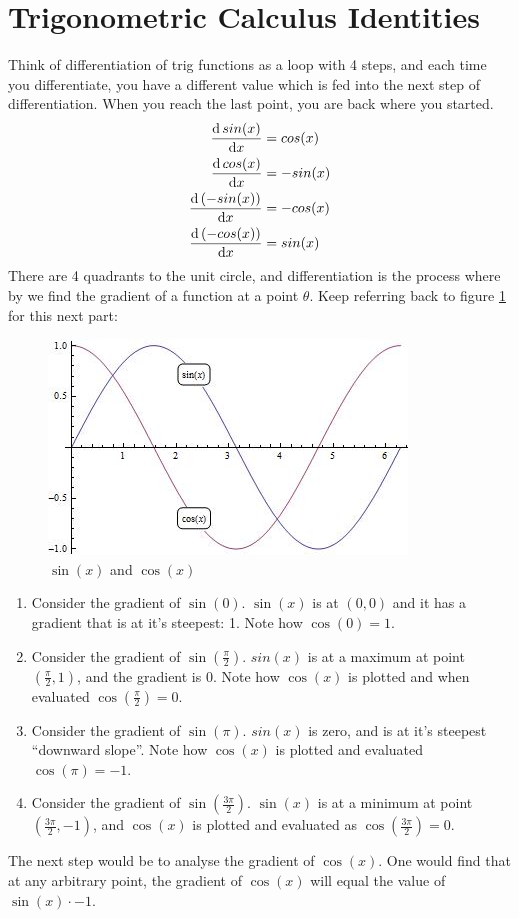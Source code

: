 \section{Trigonometric Calculus Identities}
\label{sec:TrigCalculus}
Think of differentiation of trig functions as a loop with 4 steps, and each time
you differentiate, you have a different value which is fed into the next step of
differentiation. When you reach the last point, you are back where you
started.
\begin{align}
  \frac{\mathrm{d}\,sin(x)}{\mathrm{d}x}  & = cos(x) \\
  \frac{\mathrm{d}\,cos(x)}{\mathrm{d}x}  & = -sin(x) \\
  \frac{\mathrm{d}\,(-sin(x))}{\mathrm{d}x} & = -cos(x) \\
  \frac{\mathrm{d}\,(-cos(x))}{\mathrm{d}x} & = sin(x)
\end{align}
There are 4 quadrants to the unit circle, and differentiation is the process
where by we find the gradient of a function at a point $\theta$. Keep referring
back to figure \ref{fig:TrigCalcSinxCosx} for this next part:  
 \begin{figure}[!htb]
  \begin{center}
    \includegraphics{img/sinxcosx}
    \caption{$\sin(x)$ and $\cos(x)$}
    \label{fig:TrigCalcSinxCosx}
  \end{center}
\end{figure}
\begin{enumerate}
  \item Consider the gradient of $\sin(0)$. $\sin(x)$ is at $(0,0)$ and it has a
  gradient that is at it's steepest: 1. Note how $\cos(0)=1$.
  \item Consider the gradient of $\sin(\frac{\pi}{2})$. $sin(x)$ is at a maximum
  at point $(\frac{\pi}{2},1)$, and the gradient is $0$. Note how
  $\cos(x)$ is plotted and when evaluated $\cos(\frac{\pi}{2})=0$.
  \item Consider the gradient of $\sin(\pi)$. $sin(x)$ is zero, and is at it's
  steepest ``downward slope''. Note how $\cos(x)$ is plotted and evaluated
  $\cos(\pi)=-1$.
  \item Consider the gradient of $\sin(\frac{3\pi}{2})$. $\sin(x)$ is at a
  minimum at point $(\frac{3\pi}{2},-1)$, and $\cos(x)$ is plotted and
  evaluated as $\cos(\frac{3\pi}{2})=0$.
\end{enumerate}
The next step would be to analyse the gradient of $\cos(x)$. One would find that
at any arbitrary point, the gradient of $\cos(x)$ will equal the value of
$\sin(x) \cdot -1$.

